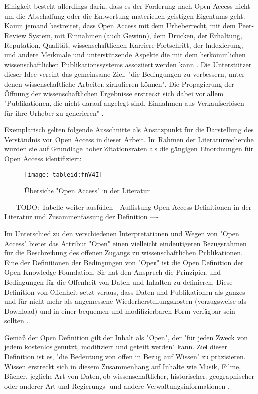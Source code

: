 Einigkeit besteht allerdings darin, dass es der Forderung nach Open Access nicht um die Abschaffung oder die Entwertung materiellen geistigen Eigentums geht. Kaum jemand bestreitet, dass Open Access mit dem Urheberrecht, mit dem Peer-Review System, mit Einnahmen (auch Gewinn), dem Drucken, der Erhaltung, Reputation, Qualität, wissenschaftlichen Karriere-Fortschritt, der Indexierung, und andere Merkmale und unterstützende Aspekte die mit dem herkömmlichen wissenschaftlichen Publikationssystems assoziiert werden kann \cite{suber_2015}. Die Unterstützer dieser Idee vereint das gemeinsame Ziel, "die Bedingungen zu verbessern, unter denen wissenschaftliche Arbeiten zirkulieren können"\cite{Adema_2014_open_access}. Die Propagierung der Öffnung der wissenschaftlichen Ergebnisse erstreckt sich dabei vor allem "Publikationen, die nicht darauf angelegt sind, Einnahmen aus Verkaufserlösen für ihre Urheber zu generieren" \cite{muller_2010_open}.

Exemplarisch gelten folgende Ausschnitte als Ansatzpunkt für die Darstellung des Verständnis von Open Access in dieser Arbeit. Im Rahmen der Literaturrecherche wurden sie auf Grundlage hoher Zitationsraten als die gängigen Einordnungen für Open Access identifiziert:
\begin{figure}[h!]
\texttt{[image: tableid:fnV4I]}
\caption{Übersiche "Open Access" in der Literatur}
\end{figure}

---- TODO: Tabelle weiter ausfüllen - Auflistung Open Access Definitionen in der Literatur und Zusammenfassung der Definition ----

Im Unterschied zu den verschiedenen Interpretationen und Wegen von "Open Access" bietet das Attribut "Open" einen vielleicht eindeutigeren Bezugsrahmen für die Beschreibung des offenen Zugangs zu wissenschaftlichen Publikationen. Eine der Definitionen der Bedingungen von "Open" ist die Open Definition der Open Knowledge Foundation. Sie hat den Anspruch die Prinzipien und Bedingungen für die Offenheit von Daten und Inhalten zu definieren. Diese Definition von Offenheit setzt voraus, dass Daten und Publikationen als ganzes und für nicht mehr als angemessene Wiederherstellungskosten (vorzugsweise als Download) und in einer bequemen und modifizierbaren Form verfügbar sein sollten \cite{Molloy_2011}.

Gemäß der Open Definition gilt der Inhalt als "Open", der "für jeden Zweck von jedem kostenlos genutzt, modifiziert und geteilt werden" \cite{open_definition} kann. Ziel dieser Definition ist es, "die Bedeutung von offen in Bezug auf Wissen" zu präzisieren. Wissen erstreckt sich in diesem Zusammenhang auf Inhalte wie Musik, Filme, Bücher, jegliche Art von Daten, ob wissenschaftlicher, historischer, geographischer oder anderer Art und Regierungs- und andere Verwaltungsinformationen \cite{open_definition}.

